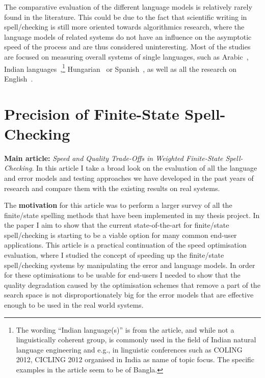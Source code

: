 \documentclass[officiallayout]{unihelcompling}
\begin{document}
The comparative evaluation of the different language models is relatively
rarely found in the literature. This could be due to the fact that scientific
writing in spell\-/checking is still more oriented towards algorithmics
research, where the language models of related systems do not have an influence
on the asymptotic speed of the process and are thus considered uninteresting.
Most of the studies are focused on measuring overall systems of single
languages, such as Arabic~\citep{attia2013improved}, Indian
languages~\citep{chaudhuri2002towards},\footnote{The wording ``Indian
    language(s)'' is from the article, and while not a linguistically coherent
    group, is commonly used in the field of Indian natural language engineering
and e.g., in linguistic conferences such as COLING 2012, CICLING 2012 organised
in India as name of topic focus. The specific examples in the article seem to
be of Bangla.} Hungarian~\citep{tron2005hunmorph} or
Spanish~\cite{otero2007contextual}, as well as all the research on
English~\citep{mitton1987spelling}.

\section{Precision of Finite-State Spell-Checking}
\label{sec:quality}

\textbf{Main article:} \emph{Speed and Quality Trade-Offs in Weighted
Finite-State Spell-Checking}. In this article I take a broad look on the
evaluation of all the language and error models and testing approaches we have
developed in the past years of research and compare them with the existing
results on real systems.

The \textbf{motivation} for this article was to perform a larger survey of all
the finite\-/state spelling methods that have been implemented in my thesis
project. In the paper I aim to show that the current state-of-the-art for
finite\-/state spell\-/checking is starting to be a viable option for many
common end-user applications. This article is a practical continuation of the
speed optimisation evaluation, where I studied the concept of speeding up the
finite\-/state spell\-/checking systems by manipulating the error and language
models. In order for these optimisations to be usable for end-users I needed to
show that the quality degradation caused by the optimisation schemes that
remove a part of the search space is not disproportionately big for the error
models that are effective enough to be used in the real world systems.
\end{document}
